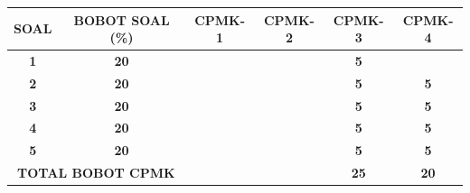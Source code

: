 \documentclass[11pt]{article}
\begin{document}
\begin{center}
  \begin{tabular}{|c|c|c|c|c|c|}
    \hline
    \textbf{SOAL}                                   & \textbf{BOBOT SOAL (\%)} & \textbf{CPMK-1} & \textbf{CPMK-2} & \textbf{CPMK-3} & \textbf{CPMK-4} \\ \hline
    \textbf{1}                                      & \textbf{20}              &                 &                 & \textbf{5}      &                 \\ \hline
    \textbf{2}                                      & \textbf{20}              &                 &                 & \textbf{5}      & \textbf{5}      \\ \hline
    \textbf{3}                                      & \textbf{20}              &                 &                 & \textbf{5}      & \textbf{5}      \\ \hline
    \textbf{4}                                      & \textbf{20}              &                 &                 & \textbf{5}      & \textbf{5}      \\ \hline
    \textbf{5}                                      & \textbf{20}              &                 &                 & \textbf{5}      & \textbf{5}      \\ \hline
    \multicolumn{2}{|c|}{\textbf{TOTAL BOBOT CPMK}} &                          &                 & \textbf{25}     & \textbf{20}                       \\ \hline
  \end{tabular}
\end{center}
\end{document}
